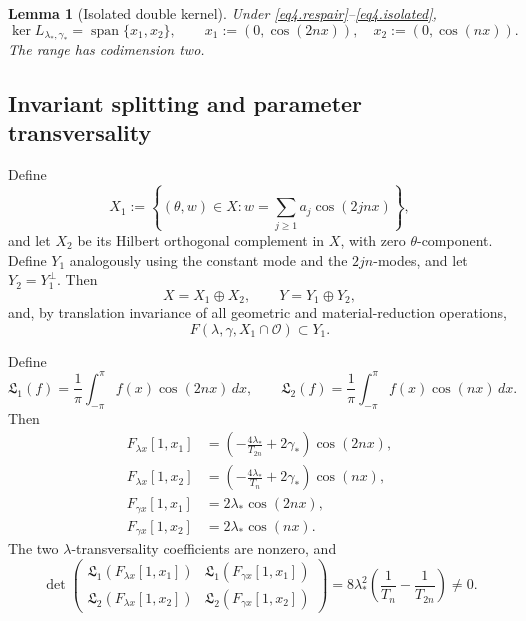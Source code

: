 \documentclass[12pt]{article}
\numberwithin{equation}{section}
\newtheorem{lemma}[theorem]{Lemma}
\numberwithin{equation}{section}
\begin{document}
\begin{lemma}[Isolated double kernel]\label{lem4double}
Under \eqref{eq4.respair}--\eqref{eq4.isolated},
\[
\ker L_{\lambda_*,\gamma_*}
=
\operatorname{span}\{x_1,x_2\},
\qquad
x_1:=(0,\cos(2nx)),\quad
x_2:=(0,\cos(nx)).
\]
The range has codimension two.
\end{lemma}

\subsection{Invariant splitting and parameter transversality}

Define
\[
X_1
:=
\left\{
(\theta,w)\in X:
w=\sum_{j\ge1}a_j\cos(2jnx)
\right\},
\]
and let $X_2$ be its Hilbert orthogonal complement in $X$, with zero
$\theta$-component.  Define $Y_1$ analogously using the constant mode and the
$2jn$-modes, and let $Y_2=Y_1^\perp$.  Then
\[
X=X_1\oplus X_2,\qquad Y=Y_1\oplus Y_2,
\]
and, by translation invariance of all geometric and material-reduction operations,
\begin{equation}\label{eq4.invariance}
F(\lambda,\gamma,X_1\cap\mathcal O)\subset Y_1.
\end{equation}

Define
\[
\mathfrak L_1(f)
=
\frac1\pi\int_{-\pi}^{\pi}f(x)\cos(2nx)\,dx,
\qquad
\mathfrak L_2(f)
=
\frac1\pi\int_{-\pi}^{\pi}f(x)\cos(nx)\,dx.
\]
Then
\begin{equation}\label{eq4.paramder}
\begin{aligned}
F_{\lambda x}[1,x_1]
&=\left(-\frac{4\lambda_*}{T_{2n}}+2\gamma_*\right)\cos(2nx),\\
F_{\lambda x}[1,x_2]
&=\left(-\frac{4\lambda_*}{T_n}+2\gamma_*\right)\cos(nx),\\
F_{\gamma x}[1,x_1]&=2\lambda_*\cos(2nx),\\
F_{\gamma x}[1,x_2]&=2\lambda_*\cos(nx).
\end{aligned}
\end{equation}
The two $\lambda$-transversality coefficients are nonzero, and
\begin{equation}\label{eq4.detparam}
\det
\begin{pmatrix}
\mathfrak L_1(F_{\lambda x}[1,x_1])&
\mathfrak L_1(F_{\gamma x}[1,x_1])\\
\mathfrak L_2(F_{\lambda x}[1,x_2])&
\mathfrak L_2(F_{\gamma x}[1,x_2])
\end{pmatrix}
=
8\lambda_*^2
\left(\frac1{T_n}-\frac1{T_{2n}}\right)
\neq0.
\end{equation}
\end{document}
